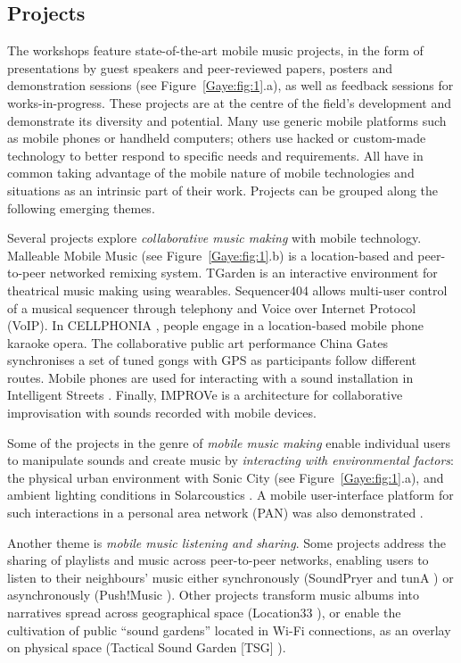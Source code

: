 \subsection{Projects}

The workshops feature state-of-the-art mobile music projects, in the form of
presentations by guest speakers and peer-reviewed papers, posters and
demonstration sessions (see Figure~\ref{Gaye:fig:1}.a), as well as feedback sessions for
works-in-progress. These projects are at the centre of the field's development
and demonstrate its diversity and potential. Many use generic mobile platforms
such as mobile phones or handheld computers; others use hacked or custom-made
technology to better respond to specific needs and requirements. All have in
common taking advantage of the mobile nature of mobile technologies and
situations as an intrinsic part of their work. Projects can be grouped along the
following emerging themes.

Several projects explore \textit{collaborative music making} with mobile
technology. Malleable Mobile Music \cite{Tanaka:2004} (see Figure~\ref{Gaye:fig:1}.b) is a location-based and
peer-to-peer networked remixing system. TGarden \cite{Ryan:2003} is an interactive
environment for theatrical music making using wearables. Sequencer404 \cite{Jimison:2006} allows
multi-user control of a musical sequencer through telephony and Voice over
Internet Protocol (VoIP). In CELLPHONIA \cite{Bull:2006}, people engage in a location-based
mobile phone karaoke opera. The collaborative public art performance China Gates
 \cite{Clay:2006} synchronises a set of tuned gongs with GPS as participants follow different
routes. Mobile phones are used for interacting with a sound installation in
Intelligent Streets \cite{Lorstad:2004}. Finally, IMPROVe \cite{Widerberg:2006} is a architecture for
collaborative improvisation with sounds recorded with mobile devices.

Some of the projects in the genre of \textit{mobile music making} enable
individual users to manipulate sounds and create music by \textit{interacting
with environmental factors}: the physical urban environment with Sonic City \cite{Gaye:2003}
(see Figure~\ref{Gaye:fig:1}.a), and ambient lighting conditions in Solarcoustics \cite{Barnard:2005}. A mobile
user-interface platform for such interactions in a personal area network (PAN)
was also demonstrated \cite{Yamauchi:2005}.

Another theme is \textit{mobile music listening and sharing}. Some projects
address the sharing of playlists and music across peer-to-peer networks, enabling
users to listen to their neighbours' music either synchronously (SoundPryer \cite{Ostergren:2004}
and tunA \cite{Bassoli:2004}) or asynchronously (Push!Music \cite{Jacobsson:2005}). Other projects transform music
albums into narratives spread across geographical space (Location33 \cite{Carter:2005}), or
enable the cultivation of public ``sound gardens'' located in Wi-Fi connections,
as an overlay on physical space (Tactical Sound Garden [TSG] \cite{Shepard:2006}).

